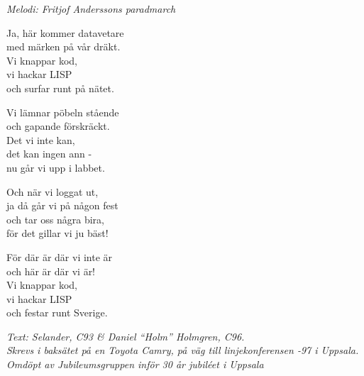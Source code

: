 {\footnotesize\textit{Melodi: Fritjof Anderssons paradmarch}}\par
\vspace{10pt}
Ja, här kommer datavetare\\
med märken på vår dräkt.\\
Vi knappar kod, \\
vi hackar LISP\\
och surfar runt på nätet.\par
\vspace{10pt}
Vi lämnar pöbeln stående\\
och gapande förskräckt.\\
Det vi inte kan, \\
det kan ingen ann -\\
nu går vi upp i labbet.\par
\vspace{10pt}
Och när vi loggat ut,\\
ja då går vi på någon fest\\
och tar oss några bira,\\
för det gillar vi ju bäst!\par
\vspace{10pt}
För där är där vi inte är\\
och här är där vi är!\\
Vi knappar kod,\\
vi hackar LISP\\
och festar runt Sverige.\par
\vspace{10pt}
{\footnotesize\textit{Text: Selander, C93 \& Daniel ``Holm''
    Holmgren, C96.\\ Skrevs i baksätet på en Toyota Camry, på väg
    till linjekonferensen -97 i Uppsala. Omdöpt av Jubileumsgruppen
    inför 30 år jubiléet i Uppsala}}
